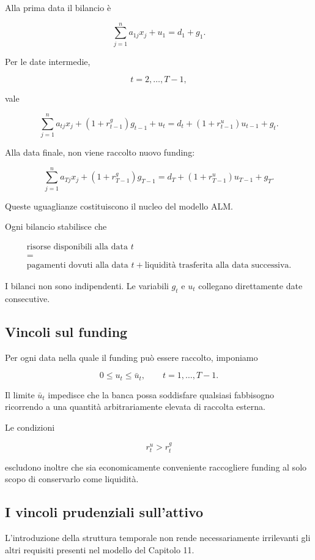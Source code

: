 Alla prima data il bilancio \`e

\[
\sum_{j=1}^{n}a_{1j}x_j
+
u_1
=
d_1+g_1.
\]

Per le date intermedie,

\[
t=2,\ldots,T-1,
\]

\noindent vale

\[
\sum_{j=1}^{n}a_{tj}x_j
+
(1+r^g_{t-1})g_{t-1}
+
u_t
=
d_t
+
(1+r^u_{t-1})u_{t-1}
+
g_t.
\]

Alla data finale, non viene raccolto nuovo funding:

\[
\sum_{j=1}^{n}a_{Tj}x_j
+
(1+r_{T-1}^{g})g_{T-1}
=
d_T
+
(1+r_{T-1}^{u})u_{T-1}
+
g_T.
\]

Queste uguaglianze costituiscono il nucleo del modello ALM.

Ogni bilancio stabilisce che

\[
\boxed{
\begin{array}{c}
\text{risorse disponibili alla data }t\\
=\\
\text{pagamenti dovuti alla data }t
+
\text{liquidit\`a trasferita alla data successiva}.
\end{array}
}
\]

I bilanci non sono indipendenti. Le variabili $g_t$ e $u_t$ collegano
direttamente date consecutive.

\subsection{Vincoli sul funding}

Per ogni data nella quale il funding pu\`o essere raccolto, imponiamo

\[
0\leq u_t\leq\bar u_t,
\qquad
t=1,\ldots,T-1.
\]

Il limite $\bar u_t$ impedisce che la banca possa soddisfare qualsiasi
fabbisogno ricorrendo a una quantit\`a arbitrariamente elevata di raccolta
esterna.

Le condizioni

\[
r^u_t>r^g_t
\]

\noindent escludono inoltre che sia economicamente conveniente raccogliere funding al
solo scopo di conservarlo come liquidit\`a.

\subsection{I vincoli prudenziali sull'attivo}

L'introduzione della struttura temporale non rende necessariamente
irrilevanti gli altri requisiti presenti nel modello del Capitolo 11.

